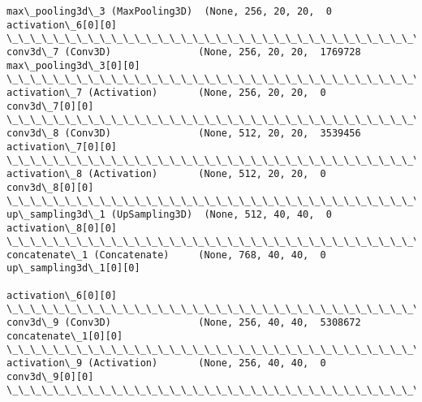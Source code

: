 \documentclass[11pt]{article}
\begin{document}
\begin{Verbatim}[commandchars=\\\{\}]
max\_pooling3d\_3 (MaxPooling3D)  (None, 256, 20, 20,  0           activation\_6[0][0]               
\_\_\_\_\_\_\_\_\_\_\_\_\_\_\_\_\_\_\_\_\_\_\_\_\_\_\_\_\_\_\_\_\_\_\_\_\_\_\_\_\_\_\_\_\_\_\_\_\_\_\_\_\_\_\_\_\_\_\_\_\_\_\_\_\_\_\_\_\_\_\_\_\_\_\_\_\_\_\_\_\_\_\_\_\_\_\_\_\_\_\_\_\_\_\_\_\_\_
conv3d\_7 (Conv3D)               (None, 256, 20, 20,  1769728     max\_pooling3d\_3[0][0]            
\_\_\_\_\_\_\_\_\_\_\_\_\_\_\_\_\_\_\_\_\_\_\_\_\_\_\_\_\_\_\_\_\_\_\_\_\_\_\_\_\_\_\_\_\_\_\_\_\_\_\_\_\_\_\_\_\_\_\_\_\_\_\_\_\_\_\_\_\_\_\_\_\_\_\_\_\_\_\_\_\_\_\_\_\_\_\_\_\_\_\_\_\_\_\_\_\_\_
activation\_7 (Activation)       (None, 256, 20, 20,  0           conv3d\_7[0][0]                   
\_\_\_\_\_\_\_\_\_\_\_\_\_\_\_\_\_\_\_\_\_\_\_\_\_\_\_\_\_\_\_\_\_\_\_\_\_\_\_\_\_\_\_\_\_\_\_\_\_\_\_\_\_\_\_\_\_\_\_\_\_\_\_\_\_\_\_\_\_\_\_\_\_\_\_\_\_\_\_\_\_\_\_\_\_\_\_\_\_\_\_\_\_\_\_\_\_\_
conv3d\_8 (Conv3D)               (None, 512, 20, 20,  3539456     activation\_7[0][0]               
\_\_\_\_\_\_\_\_\_\_\_\_\_\_\_\_\_\_\_\_\_\_\_\_\_\_\_\_\_\_\_\_\_\_\_\_\_\_\_\_\_\_\_\_\_\_\_\_\_\_\_\_\_\_\_\_\_\_\_\_\_\_\_\_\_\_\_\_\_\_\_\_\_\_\_\_\_\_\_\_\_\_\_\_\_\_\_\_\_\_\_\_\_\_\_\_\_\_
activation\_8 (Activation)       (None, 512, 20, 20,  0           conv3d\_8[0][0]                   
\_\_\_\_\_\_\_\_\_\_\_\_\_\_\_\_\_\_\_\_\_\_\_\_\_\_\_\_\_\_\_\_\_\_\_\_\_\_\_\_\_\_\_\_\_\_\_\_\_\_\_\_\_\_\_\_\_\_\_\_\_\_\_\_\_\_\_\_\_\_\_\_\_\_\_\_\_\_\_\_\_\_\_\_\_\_\_\_\_\_\_\_\_\_\_\_\_\_
up\_sampling3d\_1 (UpSampling3D)  (None, 512, 40, 40,  0           activation\_8[0][0]               
\_\_\_\_\_\_\_\_\_\_\_\_\_\_\_\_\_\_\_\_\_\_\_\_\_\_\_\_\_\_\_\_\_\_\_\_\_\_\_\_\_\_\_\_\_\_\_\_\_\_\_\_\_\_\_\_\_\_\_\_\_\_\_\_\_\_\_\_\_\_\_\_\_\_\_\_\_\_\_\_\_\_\_\_\_\_\_\_\_\_\_\_\_\_\_\_\_\_
concatenate\_1 (Concatenate)     (None, 768, 40, 40,  0           up\_sampling3d\_1[0][0]            
                                                                 activation\_6[0][0]               
\_\_\_\_\_\_\_\_\_\_\_\_\_\_\_\_\_\_\_\_\_\_\_\_\_\_\_\_\_\_\_\_\_\_\_\_\_\_\_\_\_\_\_\_\_\_\_\_\_\_\_\_\_\_\_\_\_\_\_\_\_\_\_\_\_\_\_\_\_\_\_\_\_\_\_\_\_\_\_\_\_\_\_\_\_\_\_\_\_\_\_\_\_\_\_\_\_\_
conv3d\_9 (Conv3D)               (None, 256, 40, 40,  5308672     concatenate\_1[0][0]              
\_\_\_\_\_\_\_\_\_\_\_\_\_\_\_\_\_\_\_\_\_\_\_\_\_\_\_\_\_\_\_\_\_\_\_\_\_\_\_\_\_\_\_\_\_\_\_\_\_\_\_\_\_\_\_\_\_\_\_\_\_\_\_\_\_\_\_\_\_\_\_\_\_\_\_\_\_\_\_\_\_\_\_\_\_\_\_\_\_\_\_\_\_\_\_\_\_\_
activation\_9 (Activation)       (None, 256, 40, 40,  0           conv3d\_9[0][0]                   
\_\_\_\_\_\_\_\_\_\_\_\_\_\_\_\_\_\_\_\_\_\_\_\_\_\_\_\_\_\_\_\_\_\_\_\_\_\_\_\_\_\_\_\_\_\_\_\_\_\_\_\_\_\_\_\_\_\_\_\_\_\_\_\_\_\_\_\_\_\_\_\_\_\_\_\_\_\_\_\_\_\_\_\_\_\_\_\_\_\_\_\_\_\_\_\_\_\_

\end{Verbatim}
\end{document}
